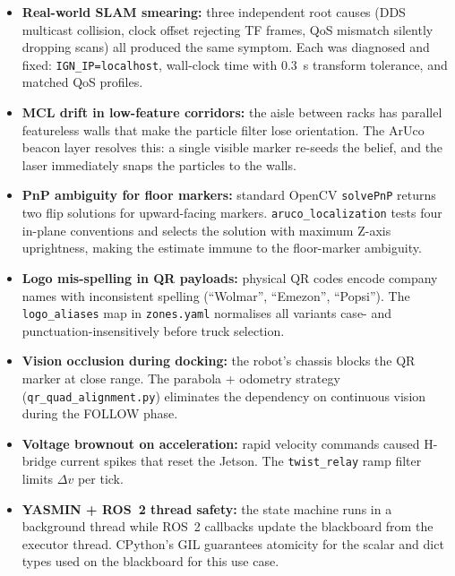 \documentclass[conference]{IEEEtran}
\begin{document}
\begin{itemize}[leftmargin=*]
  \item \textbf{Real-world SLAM smearing:} three independent root causes
        (DDS multicast collision, clock offset rejecting TF frames, QoS
        mismatch silently dropping scans) all produced the same symptom.
        Each was diagnosed and fixed: \texttt{IGN\_IP=localhost}, wall-clock
        time with 0.3~s transform tolerance, and matched QoS profiles.
  \item \textbf{MCL drift in low-feature corridors:} the aisle between
        racks has parallel featureless walls that make the particle filter
        lose orientation. The ArUco beacon layer resolves this: a single
        visible marker re-seeds the belief, and the laser immediately snaps
        the particles to the walls.
  \item \textbf{PnP ambiguity for floor markers:} standard OpenCV
        \texttt{solvePnP} returns two flip solutions for upward-facing
        markers. \texttt{aruco\_localization} tests four in-plane
        conventions and selects the solution with maximum Z-axis
        uprightness, making the estimate immune to the floor-marker
        ambiguity.
  \item \textbf{Logo mis-spelling in QR payloads:} physical QR codes
        encode company names with inconsistent spelling (``Wolmar'',
        ``Emezon'', ``Popsi''). The \texttt{logo\_aliases} map in
        \texttt{zones.yaml} normalises all variants case- and
        punctuation-insensitively before truck selection.
  \item \textbf{Vision occlusion during docking:} the robot's chassis
        blocks the QR marker at close range. The parabola + odometry
        strategy (\texttt{qr\_quad\_alignment.py}) eliminates the
        dependency on continuous vision during the FOLLOW phase.
  \item \textbf{Voltage brownout on acceleration:} rapid velocity
        commands caused H-bridge current spikes that reset the Jetson.
        The \texttt{twist\_relay} ramp filter limits $\Delta v$ per tick.
  \item \textbf{YASMIN + ROS~2 thread safety:} the state machine runs in
        a background thread while ROS~2 callbacks update the blackboard
        from the executor thread. CPython's GIL guarantees atomicity for
        the scalar and dict types used on the blackboard for this use case.
\end{itemize}

\end{document}
